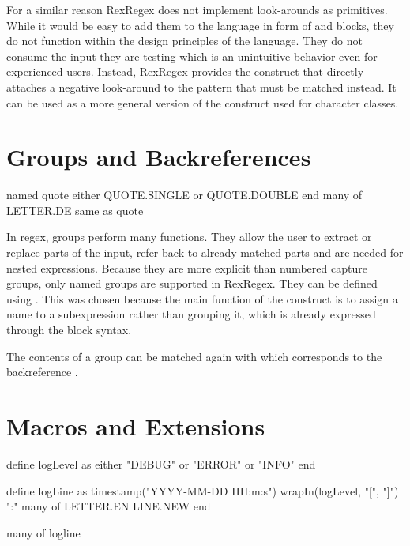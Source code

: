 For a similar reason RexRegex does not implement look-arounds as primitives. While it would be easy to add them to the language in form of  and  blocks, they do not function within the design principles of the language. They do not consume the input they are testing which is an unintuitive behavior even for experienced users. Instead, RexRegex provides the  construct that directly attaches a negative look-around to the pattern that must be matched instead. It can be used as a more general version of the  construct used for character classes.

\section{Groups and Backreferences}

\begin{rexregexBox}[label=code:dslGroupsAndBackrefs,title=Groups and backreferences in RexRegex,width=11.3cm,center]
named quote
    either QUOTE.SINGLE or QUOTE.DOUBLE
end
many of LETTER.DE
same as quote
\end{rexregexBox}

In regex, groups perform many functions. They allow the user to extract or replace parts of the input, refer back to already matched parts and are needed for nested expressions. Because they are more explicit than numbered capture groups, only named groups are supported in RexRegex. They can be defined using . This was chosen because the main function of the construct is to assign a name to a subexpression rather than grouping it, which is already expressed through the block syntax.

The contents of a group can be matched again with  which corresponds to the backreference . 

\section{Macros and Extensions} \label{sec:macros}

\begin{rexregexBox}[float=htb,label=code:dslMacros,title=Variables and macros in RexRegex,width=11.2cm,center]
define logLevel as
    either "DEBUG" or "ERROR" or "INFO"
end

define logLine as
    timestamp("YYYY-MM-DD HH:m:s")
    wrapIn(logLevel, "[", "]")
    ":"
    many of LETTER.EN
    LINE.NEW
end

many of logline
\end{rexregexBox}

